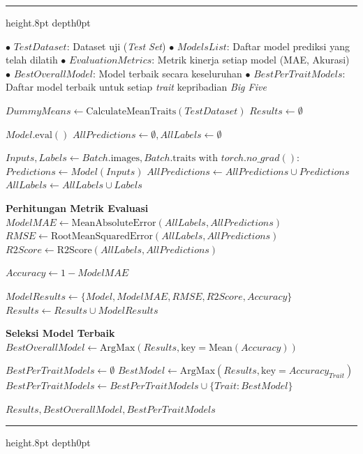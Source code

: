 {
	\vspace{2ex}
	\hrule height.8pt depth0pt \kern5pt
	
	\begin{algorithmic}[1]
		\Input 
		\Statex $\bullet$ $TestDataset$: Dataset uji (\textit{Test Set})
		\Statex $\bullet$ $ModelsList$: Daftar model prediksi yang telah dilatih
		\Output 
		\Statex $\bullet$ $EvaluationMetrics$: Metrik kinerja setiap model (MAE, Akurasi)
		\Statex $\bullet$ $BestOverallModel$: Model terbaik secara keseluruhan
		\Statex $\bullet$ $BestPerTraitModels$: Daftar model terbaik untuk setiap \textit{trait} kepribadian \textit{Big Five}
		
		\State $DummyMeans \gets \text{CalculateMeanTraits}(TestDataset)$ 
		\State $Results \gets \emptyset$
		
		\State $Model.\text{eval}()$
		\State $AllPredictions \gets \emptyset, AllLabels \gets \emptyset$
		
		\State $Inputs, Labels \gets Batch.\text{images}, Batch.\text{traits}$
		\State $\text{with } torch.no\_grad():$
		\State \quad $Predictions \gets Model(Inputs)$ 
		\State $AllPredictions \gets AllPredictions \cup Predictions$
		\State $AllLabels \gets AllLabels \cup Labels$
		\EndFor
		
		\State \textbf{Perhitungan Metrik Evaluasi}
		\State $ModelMAE \gets \text{MeanAbsoluteError}(AllLabels, AllPredictions)$
		\State $RMSE \gets \text{RootMeanSquaredError}(AllLabels, AllPredictions)$
		\State $R2Score \gets \text{R2Score}(AllLabels, AllPredictions)$
		
		\State $Accuracy \gets 1 - ModelMAE$ 
		
		\State $ModelResults \gets \{Model, ModelMAE, RMSE, R2Score, Accuracy\}$
		\State $Results \gets Results \cup ModelResults$
		\EndFor
		
		\State \textbf{Seleksi Model Terbaik}
		\State $BestOverallModel \gets \text{ArgMax}(Results, \text{key}=\text{Mean}(Accuracy))$ 
		
		\State $BestPerTraitModels \gets \emptyset$
		\State $BestModel \gets \text{ArgMax}(Results, \text{key}=Accuracy_{Trait})$ 
		\State $BestPerTraitModels \gets BestPerTraitModels \cup \{Trait: BestModel\}$
		\EndFor
		
		\State \Return $Results, BestOverallModel, BestPerTraitModels$
		\EndProcedure
	\end{algorithmic}
	
	\nopagebreak
	\kern2pt\hrule height.8pt depth0pt \kern15pt 
	\nopagebreak
	
	\label{alg:model-evaluation}
}

